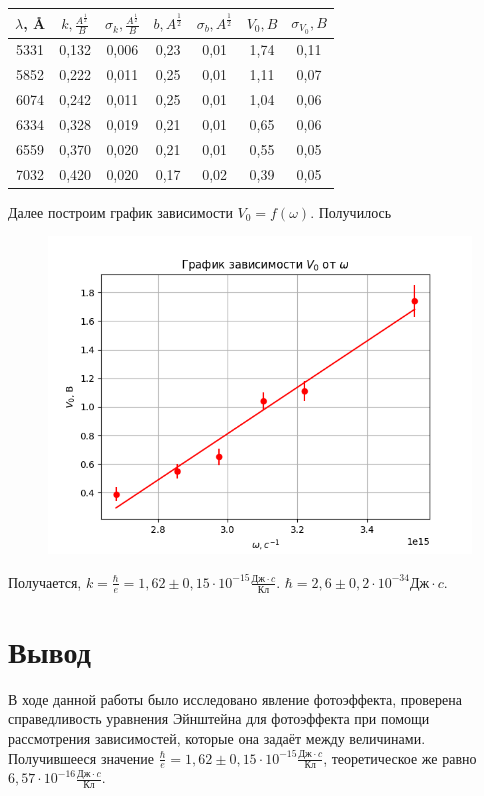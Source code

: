 \documentclass[a4paper,12pt]{article}
\begin{document}
\begin{table}[H]
\centering
\begin{tabular}{|c|c|c|c|c|c|c|}
\hline
$\lambda$, \AA & $k, \frac{A^\frac{1}{2}}{B}$ & $\sigma_k, \frac{A^\frac{1}{2}}{B}$ & $b, A^\frac{1}{2}$ & $\sigma_b, A^\frac{1}{2}$ & $V_0, B$ & $\sigma_{V_0}, B$ \\
\hline
5331 & 0,132 & 0,006 & 0,23 & 0,01 & 1,74 & 0,11 \\
\hline
5852 & 0,222 & 0,011 & 0,25 & 0,01 & 1,11 & 0,07 \\
\hline
6074 & 0,242 & 0,011 & 0,25 & 0,01 & 1,04 & 0,06\\
\hline
6334 & 0,328 & 0,019 & 0,21 & 0,01 & 0,65 & 0,06\\
\hline
6559 & 0,370 & 0,020 & 0,21 & 0,01 & 0,55 & 0,05 \\
\hline
7032 & 0,420 & 0,020 & 0,17 & 0,02 & 0,39 & 0,05\\
\hline 

\end{tabular}
\end{table}
\newpage
Далее построим график зависимости $V_0 = f(\omega)$. Получилось

\begin{figure}[H]
\centering
\includegraphics[scale=0.8]{graph3.png}
\end{figure}

Получается, $k = \frac{\hbar}{e} = 1,62 \pm 0,15 \cdot 10^{-15} \frac{\text{Дж} \cdot c}{\text{Кл}}$. $\hbar = 2,6 \pm 0,2 \cdot 10^{-34} \text{Дж} \cdot c$.

\section{Вывод}
В ходе данной работы было исследовано явление фотоэффекта, проверена справедливость уравнения Эйнштейна для фотоэффекта при помощи рассмотрения зависимостей, которые она задаёт между величинами. Получившееся значение $\frac{\hbar}{e} = 1,62 \pm 0,15 \cdot 10^{-15} \frac{\text{Дж} \cdot c}{\text{Кл}}$, теоретическое же равно $6,57 \cdot 10^{-16} \frac{\text{Дж} \cdot c}{\text{Кл}}$.
\end{document}
